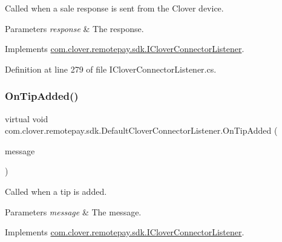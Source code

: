 Called when a sale response is sent from the Clover device. 


\begin{DoxyParams}{Parameters}
{\em response} & The response.\\
\hline
\end{DoxyParams}


Implements \hyperlink{interfacecom_1_1clover_1_1remotepay_1_1sdk_1_1_i_clover_connector_listener_a7a3aefe10180145d42d02a6a391b0113}{com.\+clover.\+remotepay.\+sdk.\+I\+Clover\+Connector\+Listener}.



Definition at line 279 of file I\+Clover\+Connector\+Listener.\+cs.

\mbox{\label{classcom_1_1clover_1_1remotepay_1_1sdk_1_1_default_clover_connector_listener_a8d3f850e69a03e0ef259f992a4865b52}} 
\subsubsection{\texorpdfstring{On\+Tip\+Added()}{OnTipAdded()}}
{\footnotesize\ttfamily virtual void com.\+clover.\+remotepay.\+sdk.\+Default\+Clover\+Connector\+Listener.\+On\+Tip\+Added (\begin{DoxyParamCaption}\item[{Tip\+Added\+Message}]{message }\end{DoxyParamCaption})\hspace{0.3cm}{\ttfamily [virtual]}}



Called when a tip is added. 


\begin{DoxyParams}{Parameters}
{\em message} & The message.\\
\hline
\end{DoxyParams}


Implements \hyperlink{interfacecom_1_1clover_1_1remotepay_1_1sdk_1_1_i_clover_connector_listener_a39348a8d97a69efbbdf03e3ccbdced7d}{com.\+clover.\+remotepay.\+sdk.\+I\+Clover\+Connector\+Listener}.



